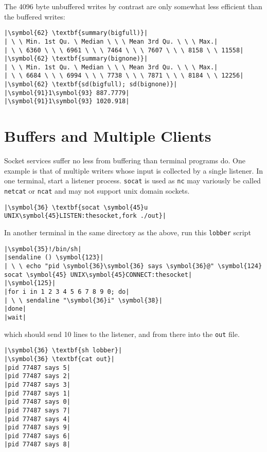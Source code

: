 \documentclass[10pt,a4paper]{article}
\begin{document}
The 4096 byte unbuffered writes by contrast are only somewhat less
efficient than the buffered writes:

\begin{lstlisting}
|\symbol{62} \textbf{summary(bigfull)}|
| \ \ Min. 1st Qu. \ Median \ \ \ Mean 3rd Qu. \ \ \ Max.|
| \ \ 6360 \ \ \ 6961 \ \ \ 7464 \ \ \ 7607 \ \ \ 8158 \ \ 11558|
|\symbol{62} \textbf{summary(bignone)}|
| \ \ Min. 1st Qu. \ Median \ \ \ Mean 3rd Qu. \ \ \ Max.|
| \ \ 6684 \ \ \ 6994 \ \ \ 7738 \ \ \ 7871 \ \ \ 8184 \ \ 12256|
|\symbol{62} \textbf{sd(bigfull); sd(bignone)}|
|\symbol{91}1\symbol{93} 887.7779|
|\symbol{91}1\symbol{93} 1020.918|
\end{lstlisting}

\section*{Buffers and Multiple Clients}

Socket services suffer no less from buffering than terminal
programs do. One example is that of multiple writers whose input is
collected by a single listener. In one terminal, start a listener
process. \texttt{socat} is used as \texttt{nc} may variously be
called \texttt{netcat} or \texttt{ncat} and may not support unix
domain sockets.

\begin{lstlisting}
|\symbol{36} \textbf{socat \symbol{45}u UNIX\symbol{45}LISTEN:thesocket,fork ./out}|
\end{lstlisting}

In another terminal in the same directory as the above, run this
\texttt{lobber} script

\begin{lstlisting}
|\symbol{35}!/bin/sh|
|sendaline () \symbol{123}|
| \ \ echo "pid \symbol{36}\symbol{36} says \symbol{36}@" \symbol{124} socat \symbol{45} UNIX\symbol{45}CONNECT:thesocket|
|\symbol{125}|
|for i in 1 2 3 4 5 6 7 8 9 0; do|
| \ \ sendaline "\symbol{36}i" \symbol{38}|
|done|
|wait|
\end{lstlisting}

which should send 10 lines to the listener, and from there into the
\texttt{out} file.

\begin{lstlisting}
|\symbol{36} \textbf{sh lobber}|
|\symbol{36} \textbf{cat out}|
|pid 77487 says 5|
|pid 77487 says 2|
|pid 77487 says 3|
|pid 77487 says 1|
|pid 77487 says 0|
|pid 77487 says 7|
|pid 77487 says 4|
|pid 77487 says 9|
|pid 77487 says 6|
|pid 77487 says 8|
\end{lstlisting}
\end{document}
